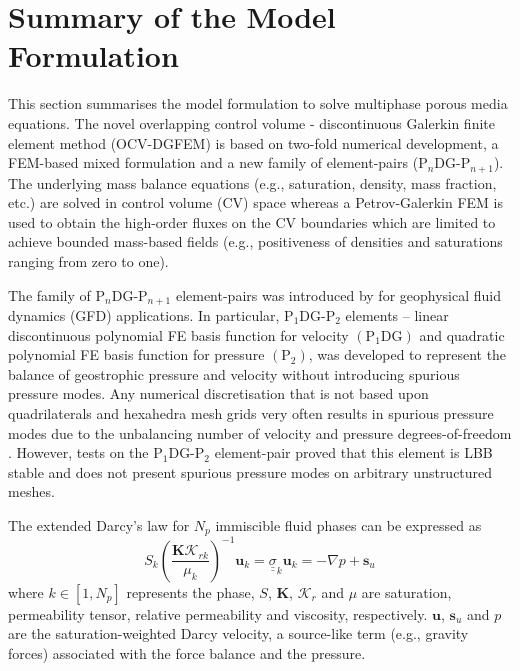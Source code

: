 \documentclass[preprint,authoryear,12pt]{elsarticle}
\newcommand{\PN}[2][error]{P$_{#1}$DG-P$_{#2}$}
\begin{document}


\section{Summary of the Model Formulation}\label{Section:SummaryPaper1}
This section summarises the model formulation to solve multiphase porous media equations.  The novel overlapping control volume - discontinuous Galerkin finite element method (OCV-DGFEM) is based on two-fold numerical development, a FEM-based mixed formulation and a new family of element-pairs (\PN[n]{n+1}).  The underlying mass balance equations (e.g., saturation, density, mass fraction, etc.) are solved in control volume (CV) space whereas a Petrov-Galerkin FEM is used to obtain the high-order fluxes on the CV boundaries which are limited to achieve bounded mass-based fields (e.g., positiveness of densities and saturations ranging from zero to one).

The family of \PN[n]{n+1} element-pairs was introduced by \citet{cotter_2009b} \citep[see also][]{cotter_2011} for geophysical fluid dynamics (GFD) applications. In particular, \PN[1]{2} elements -- linear discontinuous polynomial FE basis function for velocity $\left(\text{P}_{1}\text{DG}\right)$ and quadratic polynomial FE basis function for pressure $\left(\text{P}_{2}\right)$, was developed to represent the balance of geostrophic pressure and velocity without introducing spurious pressure modes. Any numerical discretisation that is not based upon quadrilaterals and hexahedra mesh grids very often results in spurious pressure modes due to the unbalancing number of velocity and pressure degrees-of-freedom \citep{sollie_phd_2010}.  However, tests on the \PN[1]{2} element-pair proved that this element is LBB stable \citep{cotter_2009a} and does not present spurious pressure modes on arbitrary unstructured meshes. 

The extended Darcy's law for $N_{p}$ immiscible fluid phases can be expressed as
\begin{equation}
S_{k}\left(\displaystyle\frac{\mathbf{K} \mathcal{K}_{rk}}{\mu_{k}}\right)^{-1}\mathbf{u}_{k}=\underline{\underline{\sigma}}_{k} \mathbf{u}_{k} = -\nabla p + \mathbf{s}_{u} 
\end{equation}
where $k\in\left[1,N_{p}\right]$ represents the phase, $S$, $\mathbf{K}$, $\mathcal{K}_{r}$ and $\mu$ are saturation, permeability tensor, relative permeability and viscosity, respectively. $\mathbf{u}$, $\mathbf{s}_{u}$ and $p$ are the saturation-weighted Darcy velocity, a source-like term (e.g., gravity forces) associated with the force balance and the pressure.  
\end{document}
